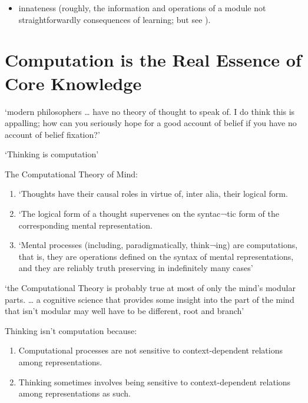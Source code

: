 \documentclass[12pt]{extarticle}
\begin{document}
\begin{multicols}{3}
\begin{itemize}
\item innateness (roughly, the information and operations of a module not straightforwardly consequences of learning; but see \citet{Samuels:2004ho}).
 
\end{itemize}
 
 
 
\section{Computation is the Real Essence of Core Knowledge}
 
‘modern philosophers … have no theory of thought to speak of. I do think this is appalling; how can you seriously hope for a good account of belief if you have no account of belief fixation?’
\citep[p.\ 147]{Fodor:1987rt}
 
‘Thinking is computation’
\citep[p.\ 9]{Fodor:1998ap}
 
The Computational Theory of Mind:
\begin{enumerate}
 
\item ‘Thoughts have their causal roles in virtue of, inter alia, their logical form.
 
\item ‘The logical form of a thought supervenes on the syntac¬tic form of the corresponding mental representation.
 
\item ‘Mental processes (including, paradigmatically, think¬ing) are computations, that is, they are operations defined on the syntax of mental representations, and they are reliably truth preserving in indefinitely many cases’
\citep[pp.\ 18--19]{Fodor:2000cj}
 
\end{enumerate}
 
‘the Computational Theory is probably true at most of only the mind’s modular parts. … a cognitive science that provides some insight into the part of the mind that isn’t modular may well have to be different, root and branch’
\citep[p.\ 99]{Fodor:2000cj}
 
Thinking isn't computation because:
 
\begin{enumerate}
 
\item Computational processes are not sensitive to context-dependent relations among representations.
 
\item Thinking sometimes involves being sensitive to context-dependent relations among representations as such.
 

\end{enumerate}
\end{multicols}
\end{document}
